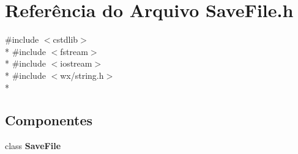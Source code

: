 \section{Referência do Arquivo Save\+File.\+h}
\label{_save_file_8h}
{\ttfamily \#include $<$cstdlib$>$}\\*
{\ttfamily \#include $<$fstream$>$}\\*
{\ttfamily \#include $<$iostream$>$}\\*
{\ttfamily \#include $<$wx/string.\+h$>$}\\*
\subsection*{Componentes}
\begin{DoxyCompactItemize}
\item 
class {\bf Save\+File}
\end{DoxyCompactItemize}
